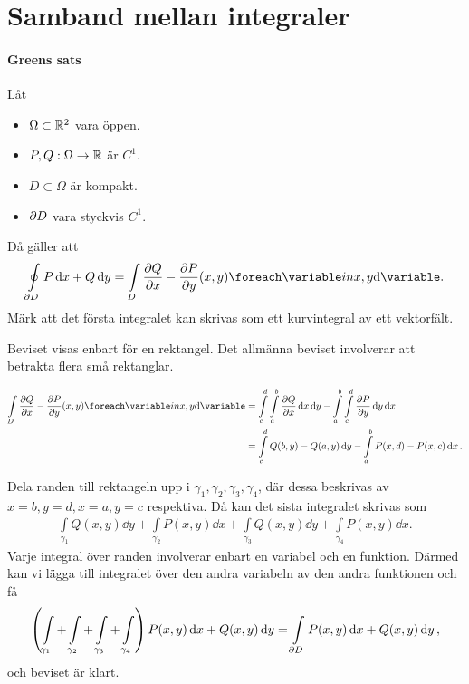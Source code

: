 \section{Samband mellan integraler}

\paragraph{Greens sats}
Låt
\begin{itemize}
	\item $\Omega\subset\mathbb{R}^2$ vara öppen.
	\item $P, Q: \Omega\to\mathbb{R}$ är $C^1$.
	\item $D\subset\Omega$ är kompakt.
	\item $\partial D$ vara styckvis $C^1$.
\end{itemize}

Då gäller att
\begin{align*}
	\oint\limits_{\bound{D}}P\dd{x} + Q\dd{y} = \inteval{D}{\pdv{Q}{x} - \pdv{P}{y}}{{x, y}}.
\end{align*}
Märk att det första integralet kan skrivas som ett kurvintegral av ett vektorfält.

\proof
Beviset visas enbart för en rektangel. Det allmänna beviset involverar att betrakta flera små rektanglar.

\begin{align*}
	\inteval{D}{\pdv{Q}{x} - \pdv{P}{y}}{{x, y}} &= \int\limits_{c}^{d}\int\limits_{a}^{b}\pdv{Q}{x}(x, y)\dd{x}\dd{y} - \int\limits_{a}^{b}\int\limits_{c}^{d}\pdv{P}{y}(x, y)\dd{y}\dd{x} \\
	                                           &= \int\limits_{c}^{d}Q(b, y) - Q(a, y)\dd{y} - \int\limits_{a}^{b}P(x, d) - P(x, c)\dd{x}.
\end{align*}

Dela randen till rektangeln upp i $\gamma_1, \gamma_2, \gamma_3, \gamma_4$, där dessa beskrivas av $x = b, y = d, x = a, y = c$ respektiva. Då kan det sista integralet skrivas som
\begin{align*}
	  \int\limits_{\gamma_1}Q(x, y)\dd{y} + \int\limits_{\gamma_2}P(x, y)\dd{x} + \int\limits_{\gamma_3}Q(x, y)\dd{y} + \int\limits_{\gamma_4}P(x, y)\dd{x}.
\end{align*}	  
Varje integral över randen involverar enbart en variabel och en funktion. Därmed kan vi lägga till integralet över den andra variabeln av den andra funktionen och få
\begin{align*}
	\left(\int\limits_{\gamma_1} + \int\limits_{\gamma_2} + \int\limits_{\gamma_3} + \int\limits_{\gamma_4}\right)P(x, y)\dd{x} + Q(x, y)\dd{y} = \int\limits_{\partial D}P(x, y)\dd{x} + Q(x, y)\dd{y},
\end{align*}
och beviset är klart.